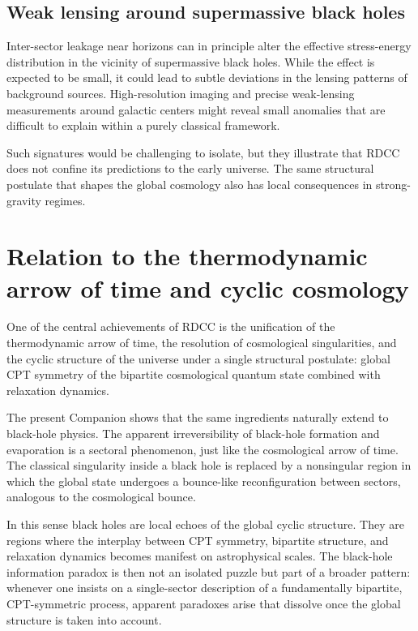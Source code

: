 \documentclass[11pt,a4paper]{article}
\begin{document}
\subsection{Weak lensing around supermassive black holes}

Inter-sector leakage near horizons can in principle alter the effective stress-energy distribution in the vicinity of supermassive black holes. While the effect is expected to be small, it could lead to subtle deviations in the lensing patterns of background sources. High-resolution imaging and precise weak-lensing measurements around galactic centers might reveal small anomalies that are difficult to explain within a purely classical framework.

Such signatures would be challenging to isolate, but they illustrate that RDCC does not confine its predictions to the early universe. The same structural postulate that shapes the global cosmology also has local consequences in strong-gravity regimes.

\section{Relation to the thermodynamic arrow of time and cyclic cosmology}

One of the central achievements of RDCC is the unification of the thermodynamic arrow of time, the resolution of cosmological singularities, and the cyclic structure of the universe under a single structural postulate: global CPT symmetry of the bipartite cosmological quantum state combined with relaxation dynamics.

The present Companion shows that the same ingredients naturally extend to black-hole physics. The apparent irreversibility of black-hole formation and evaporation is a sectoral phenomenon, just like the cosmological arrow of time. The classical singularity inside a black hole is replaced by a nonsingular region in which the global state undergoes a bounce-like reconfiguration between sectors, analogous to the cosmological bounce.

In this sense black holes are local echoes of the global cyclic structure. They are regions where the interplay between CPT symmetry, bipartite structure, and relaxation dynamics becomes manifest on astrophysical scales. The black-hole information paradox is then not an isolated puzzle but part of a broader pattern: whenever one insists on a single-sector description of a fundamentally bipartite, CPT-symmetric process, apparent paradoxes arise that dissolve once the global structure is taken into account.
\end{document}
